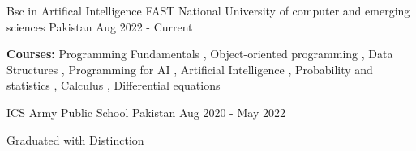

\begin{cventries}

  \cventry
    {Bsc in Artifical Intelligence} %
    {FAST National University of computer and emerging sciences} %
    {Pakistan} %
    {Aug 2022 - Current} %
    {
      \begin{cvitems} %
        \item {\textbf{Courses:} Programming Fundamentals , Object-oriented programming , Data Structures , Programming for AI , Artificial Intelligence , Probability and statistics , Calculus , Differential equations }
      \end{cvitems}
    }
    
  \cventry
    {ICS} %
    {Army Public School} %
    {Pakistan} %
    {Aug 2020 - May 2022} %
    {
      \begin{cvitems} %
        \item {Graduated with Distinction}
      \end{cvitems}
    }
    
\end{cventries}
